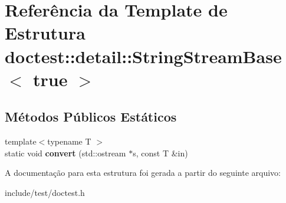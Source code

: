 \hypertarget{structdoctest_1_1detail_1_1StringStreamBase_3_01true_01_4}{}\section{Referência da Template de Estrutura doctest\+:\+:detail\+:\+:String\+Stream\+Base$<$ true $>$}
\label{structdoctest_1_1detail_1_1StringStreamBase_3_01true_01_4}
\subsection*{Métodos Públicos Estáticos}
\begin{DoxyCompactItemize}
\item 
\mbox{\label{structdoctest_1_1detail_1_1StringStreamBase_3_01true_01_4_a3f86285d254474498065e6b70522e2b7}} 
{\footnotesize template$<$typename T $>$ }\\static void {\bfseries convert} (std\+::ostream $\ast$s, const T \&in)
\end{DoxyCompactItemize}


A documentação para esta estrutura foi gerada a partir do seguinte arquivo\+:\begin{DoxyCompactItemize}
\item 
include/test/doctest.\+h\end{DoxyCompactItemize}
